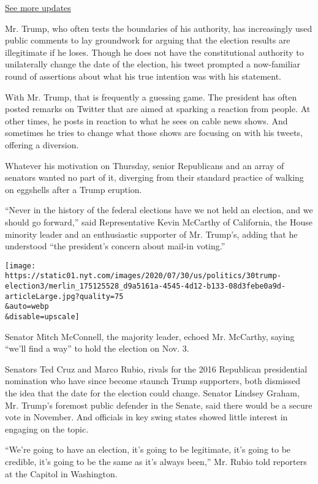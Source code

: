 \href{https://www.nytimes.com/2020/08/04/us/elections/primary-election-michigan-arizona-kansas.html?action=click\&pgtype=Article\&state=default\&region=MAIN_CONTENT_1\&context=storylines_live_updates}{See
more updates}

Mr. Trump, who often tests the boundaries of his authority, has
increasingly used public comments to lay groundwork for arguing that the
election results are illegitimate if he loses. Though he does not have
the constitutional authority to unilaterally change the date of the
election, his tweet prompted a now-familiar round of assertions about
what his true intention was with his statement.

With Mr. Trump, that is frequently a guessing game. The president has
often posted remarks on Twitter that are aimed at sparking a reaction
from people. At other times, he posts in reaction to what he sees on
cable news shows. And sometimes he tries to change what those shows are
focusing on with his tweets, offering a diversion.

Whatever his motivation on Thursday, senior Republicans and an array of
senators wanted no part of it, diverging from their standard practice of
walking on eggshells after a Trump eruption.

``Never in the history of the federal elections have we not held an
election, and we should go forward,'' said Representative Kevin McCarthy
of California, the House minority leader and an enthusiastic supporter
of Mr. Trump's, adding that he understood ``the president's concern
about mail-in voting.''

\texttt{[image: https://static01.nyt.com/images/2020/07/30/us/politics/30trump-election3/merlin\_175125528\_d9a5161a-4545-4d12-b133-08d3febe0a9d-articleLarge.jpg?quality=75\\\&auto=webp\\\&disable=upscale]}

Senator Mitch McConnell, the majority leader, echoed Mr. McCarthy,
saying ``we'll find a way'' to hold the election on Nov. 3.

Senators Ted Cruz and Marco Rubio, rivals for the 2016 Republican
presidential nomination who have since become staunch Trump supporters,
both dismissed the idea that the date for the election could change.
Senator Lindsey Graham, Mr. Trump's foremost public defender in the
Senate, said there would be a secure vote in November. And officials in
key swing states showed little interest in engaging on the topic.

``We're going to have an election, it's going to be legitimate, it's
going to be credible, it's going to be the same as it's always been,''
Mr. Rubio told reporters at the Capitol in Washington.

